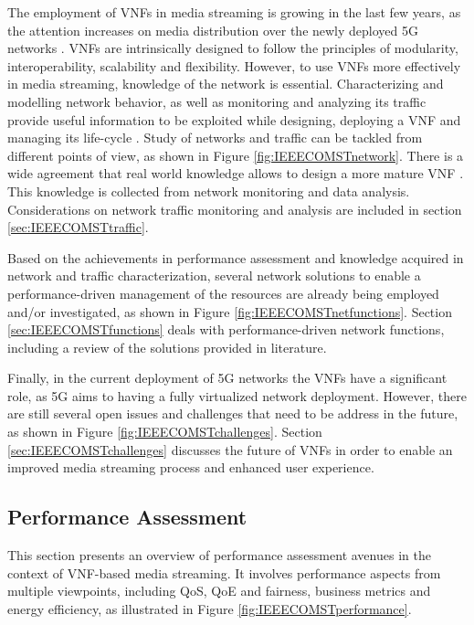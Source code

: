The employment of VNFs in media streaming is growing in the last few years, as the attention increases on media distribution over the newly deployed 5G networks \cite{Keltsch2018}. VNFs are intrinsically designed to follow the principles of modularity, interoperability, scalability and flexibility. However, to use VNFs more effectively in media streaming, knowledge of the network is essential. Characterizing and modelling network behavior, as well as monitoring and analyzing its traffic provide useful information to be exploited while designing, deploying a VNF \cite{Jahromi2018, Dieye2018} and managing its life-cycle \cite{alvarez_edge--cloud_2019}. Study of networks and traffic can be tackled from different points of view, as shown in Figure \ref{fig:IEEECOMSTnetwork}. There is a wide agreement that real world knowledge allows to design a more mature VNF \cite{zhang2019towards}. This knowledge is collected from network monitoring and data analysis. Considerations on network traffic monitoring and analysis are included in section \ref{sec:IEEECOMSTtraffic}.

Based on the achievements in performance assessment and knowledge acquired in network and traffic characterization, several network solutions to enable a performance-driven management of the resources are already being employed and/or investigated, as shown in Figure \ref{fig:IEEECOMSTnetfunctions}. Section \ref{sec:IEEECOMSTfunctions} deals with performance-driven network functions, including a review of the solutions provided in literature.

Finally, in the current deployment of 5G networks the VNFs have a significant role, as 5G aims to having a fully virtualized network deployment. However, there are still several open issues and challenges that need to be address in the future, as shown in Figure \ref{fig:IEEECOMSTchallenges}. Section \ref{sec:IEEECOMSTchallenges} discusses the future of VNFs in order to enable an improved media streaming process and enhanced user experience.

\subsection{Performance Assessment}
\label{sec:IEEECOMSTmetrics}

This section presents an overview of performance assessment avenues in the context of VNF-based media streaming. It involves performance aspects from multiple viewpoints, including QoS, QoE and fairness, business metrics and energy efficiency, as illustrated in Figure \ref{fig:IEEECOMSTperformance}.


